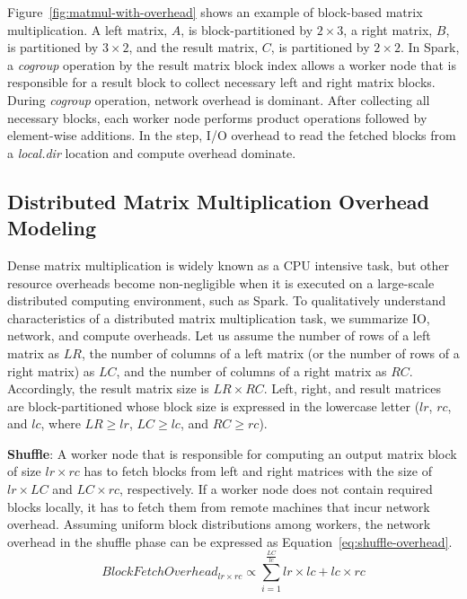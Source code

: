 \documentclass[10pt, conference, compsocconf]{IEEEtran}
\begin{document}
Figure~\ref{fig:matmul-with-overhead} shows an example of block-based matrix multiplication. A left matrix, $A$, is block-partitioned by $2 \times 3$, a right matrix, $B$, is partitioned by $3 \times 2$, and the result matrix, $C$, is partitioned by $2 \times 2$. In Spark, a \textit{cogroup} operation by the result matrix block index allows a worker node that is responsible for a result block to collect necessary left and right matrix blocks. During \textit{cogroup} operation, network overhead is dominant. After collecting all necessary blocks, each worker node performs product operations followed by element-wise additions. In the step, I/O overhead to read the fetched blocks from a \textit{local.dir} location and compute overhead dominate.

\subsection{Distributed Matrix Multiplication Overhead Modeling}\label{sec:overhead-modeling}
Dense matrix multiplication is widely known as a CPU intensive task, but other resource overheads become non-negligible when it is executed on a large-scale distributed computing environment, such as Spark. To qualitatively understand characteristics of a distributed matrix multiplication task, we summarize IO, network, and compute overheads. Let us assume the number of rows of a left matrix as $LR$, the number of columns of a left matrix (or the number of rows of a right matrix) as $LC$, and the number of columns of a right matrix as $RC$. Accordingly, the result matrix size is $LR \times RC$. Left, right, and result matrices are block-partitioned whose block size is expressed in the lowercase letter ($lr$, $rc$, and $lc$, where $LR \geq lr$, $LC \geq lc$, and $RC \geq rc$).

\textbf{Shuffle}: A worker node that is responsible for computing an output matrix block of size $lr \times rc$ has to fetch blocks from left and right matrices with the size of $lr \times LC$ and $LC \times rc$, respectively. If a worker node does not contain required blocks locally, it has to fetch them from remote machines that incur network overhead. Assuming uniform block distributions among workers, the network overhead in the shuffle phase can be expressed as Equation~\ref{eq:shuffle-overhead}.
\begin{equation}\label{eq:shuffle-overhead}
  BlockFetchOverhead_{lr \times rc} \propto \sum\limits_{i=1}^{\frac{LC}{lc}} lr \times lc + lc \times rc
\end{equation}
\end{document}
